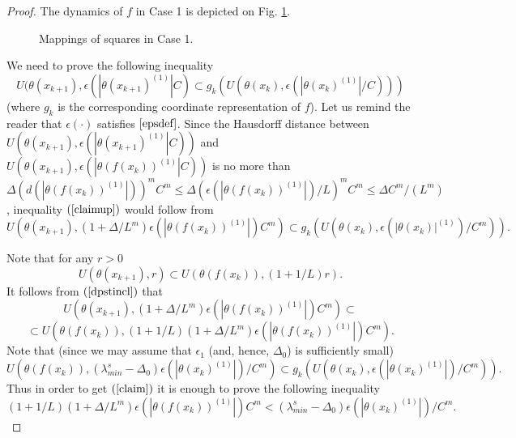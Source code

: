 \documentclass[11pt]{article}
\theoremstyle{Mystyle}
\begin{document}
\begin{proof}
The dynamics of $f$ in Case 1 is depicted on Fig. \ref{Fig2}.  

\begin{figure}[h]
	\centering

\caption{Mappings of squares in Case 1.}
\label{Fig2}
\end{figure}


We need to prove the following inequality
\begin{equation}
\label{claimup}
U(\theta(x_{k+1}),\epsilon(|\theta(x_{k+1})^{(1)}|C)\subset g_k(U(\theta(x_k),\epsilon(|\theta(x_k)^{(1)}|/C)))
\end{equation}
(where $g_k$ is the corresponding coordinate representation of $f$).
Let us remind the reader that $\epsilon(\cdot)$ satisfies $\eqref{epsdef}$.
Since the Hausdorff distance between $U(\theta(x_{k+1}),\epsilon(|\theta(x_{k+1})^{(1)}|C))$ and $U(\theta(x_{k+1}),\epsilon(|\theta(f(x_k))^{(1)}|C))$
is no more than $\Delta(d(|\theta(f(x_k))^{(1)}|))^m C^{m}\leq \Delta(\epsilon(|\theta(f(x_k))^{(1)}|)/L)^m C^m\leq \Delta C^m/(L^m)$, inequality $(\ref{claimup})$ would follow from
\begin{equation}
\label{claim}
U(\theta(x_{k+1}),(1+\Delta/L^m)\epsilon(|\theta(f(x_k))^{(1)}|)C^m)\subset g_k(U(\theta(x_k),\epsilon(|\theta(x_k)|^{(1)})/C^m)).
\end{equation}

Note that for any $r>0$
\begin{equation}
\label{dpstincl}
U(\theta(x_{k+1}),r) \subset U(\theta(f(x_k)),(1+1/L)r).
\end{equation}
It follows from $(\ref{dpstincl})$ that 
$$U(\theta(x_{k+1}),(1+\Delta/L^m)\epsilon(|\theta(f(x_k))^{(1)}|)C^m)\subset$$
$$\subset U(\theta(f(x_k)),(1+1/L)(1+\Delta/L^m)\epsilon(|\theta(f(x_k))^{(1)}|)C^m).$$ 
Note that (since we may assume that $\epsilon_1$ (and, hence, $\Delta_0$) is sufficiently small)
$$U(\theta(f(x_k)),(\lambda^{s}_{min} - \Delta_0)\epsilon(|\theta(x_k)^{(1)}|)/C^m)\subset g_k(U(\theta(x_k),\epsilon(|\theta(x_k)^{(1)}|)/C^m)).$$
Thus in order to get $(\ref{claim})$ it is enough to prove the following inequality
\begin{equation}
\label{ineq}
(1+1/L)(1+\Delta/L^m)\epsilon(|\theta(f(x_k))^{(1)}|)C^m < (\lambda^{s}_{min} - \Delta_0)\epsilon(|\theta(x_k)^{(1)}|)/C^m.
\end{equation}


\end{proof}
\end{document}
